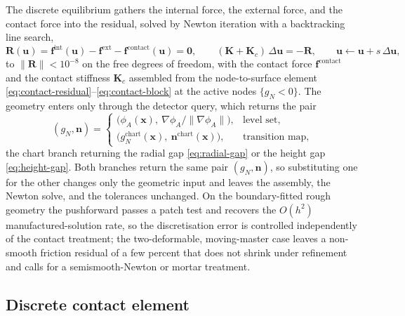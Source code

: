 \documentclass{svjour3}                 %
\newcommand{\norm}[1]{\lVert#1\rVert}
\newcommand{\nbf}{\bm{n}}
\newcommand{\xbf}{\bm{x}}
\newcommand{\ubf}{\bm{u}}
\newcommand{\fbf}{\bm{f}}
\newcommand{\gn}{g_{\scriptscriptstyle N}}
\newcommand{\grad}{\nabla}
\begin{document}
The discrete equilibrium gathers the internal force, the external force, and the contact force into the
residual, solved by Newton iteration with a backtracking line search,
\begin{equation}\label{eq:newton}
\bm R(\ubf)=\fbf^{\mathrm{int}}(\ubf)-\fbf^{\mathrm{ext}}-\fbf^{\mathrm{contact}}(\ubf)=\bm0,\qquad
(\bm K+\bm K_c)\,\Delta\ubf=-\bm R,\qquad \ubf\leftarrow\ubf+s\,\Delta\ubf,
\end{equation}
to $\norm{\bm R}<10^{-8}$ on the free degrees of freedom, with the contact force $\fbf^{\mathrm{contact}}$ and
the contact stiffness $\bm K_c$ assembled from the node-to-surface element
\eqref{eq:contact-residual}--\eqref{eq:contact-block} at the active nodes $\{\gn<0\}$. The geometry enters only
through the detector query, which returns the pair
\begin{equation}\label{eq:detector}
(\gn,\nbf)=
\begin{cases}
\big(\phi_A(\xbf),\ \grad\phi_A/\norm{\grad\phi_A}\big), & \text{level set},\\[3pt]
\big(\gn^{\mathrm{chart}}(\xbf),\ \nbf^{\mathrm{chart}}(\xbf)\big), & \text{transition map},
\end{cases}
\end{equation}
the chart branch returning the radial gap \eqref{eq:radial-gap} or the height gap \eqref{eq:height-gap}. Both
branches return the same pair $(\gn,\nbf)$, so substituting one for the other changes only the geometric input
and leaves the assembly, the Newton solve, and the tolerances unchanged. On the boundary-fitted rough geometry the
pushforward passes a patch test and recovers the $O(h^2)$ manufactured-solution rate, so the discretisation
error is controlled independently of the contact treatment; the two-deformable, moving-master case leaves a
non-smooth friction residual of a few percent that does not shrink under refinement and calls for a
semismooth-Newton or mortar treatment.

\subsection{Discrete contact element}\label{sec:discr:element}
\end{document}
